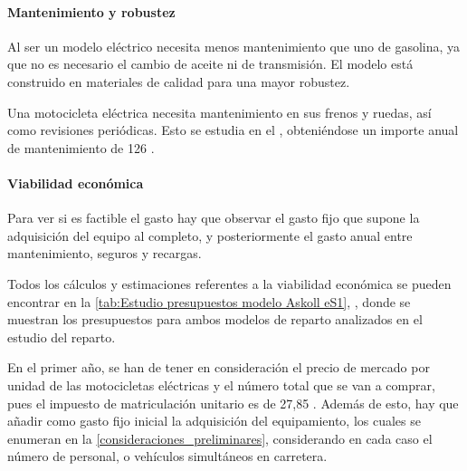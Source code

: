 \paragraph{Mantenimiento y robustez}
Al ser un modelo eléctrico necesita menos mantenimiento que uno de gasolina, ya que no es necesario el cambio de aceite ni de transmisión. El modelo está construido en materiales de calidad para una mayor robustez.

Una motocicleta eléctrica necesita mantenimiento en sus frenos y ruedas, así como revisiones periódicas. Esto se estudia en el , obteniéndose un importe anual de mantenimiento de 126 .

\paragraph{Viabilidad económica}


Para ver si es factible el gasto hay que observar el gasto fijo que supone la adquisición del equipo al completo, y posteriormente el gasto anual entre mantenimiento, seguros y recargas. 

Todos los cálculos y estimaciones referentes a la viabilidad económica se pueden encontrar en la \autoref{tab:Estudio presupuestos modelo Askoll eS1}, , donde se muestran los presupuestos para ambos modelos de reparto analizados en el estudio del reparto.

En el primer año, se han de tener en consideración el precio de mercado por unidad de las motocicletas eléctricas y el número total que se van a comprar, pues el impuesto de matriculación unitario es de 27,85 . Además de esto, hay que añadir como gasto fijo inicial la adquisición del equipamiento, los cuales se enumeran en la \autoref{consideraciones_preliminares}, considerando en cada caso el número de personal, o vehículos simultáneos en carretera.

